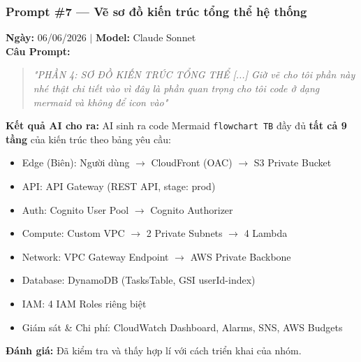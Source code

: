 \documentclass[13pt]{article}
\begin{document}
\subsubsection{Prompt \#7 — Vẽ sơ đồ kiến trúc tổng thể hệ thống}
\textbf{Ngày:} 06/06/2026 $|$ \textbf{Model:} Claude Sonnet\\
\textbf{Câu Prompt:}
\begin{quote}
\textit{"PHẦN 4: SƠ ĐỒ KIẾN TRÚC TỔNG THỂ [...] Giờ vẽ cho tôi phần này nhé thật chi tiết vào vì đây là phần quan trọng cho tôi code ở dạng mermaid và không để icon vào"}
\end{quote}
\textbf{Kết quả AI cho ra:}
AI sinh ra code Mermaid \texttt{flowchart TB} đầy đủ \textbf{tất cả 9 tầng} của kiến trúc theo bảng yêu cầu:
\begin{itemize}
    \item Edge (Biên): Người dùng $\rightarrow$ CloudFront (OAC) $\rightarrow$ S3 Private Bucket
    \item API: API Gateway (REST API, stage: prod)
    \item Auth: Cognito User Pool $\rightarrow$ Cognito Authorizer
    \item Compute: Custom VPC $\rightarrow$ 2 Private Subnets $\rightarrow$ 4 Lambda
    \item Network: VPC Gateway Endpoint $\rightarrow$ AWS Private Backbone
    \item Database: DynamoDB (TasksTable, GSI userId-index)
    \item IAM: 4 IAM Roles riêng biệt
    \item Giám sát \& Chi phí: CloudWatch Dashboard, Alarms, SNS, AWS Budgets
\end{itemize}
\textbf{Đánh giá:} Đã kiểm tra và thấy hợp lí với cách triển khai của nhóm.
\end{document}
